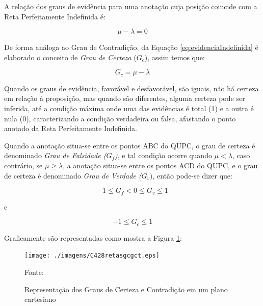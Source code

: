 A relação dos graus de evidência para uma anotação cuja posição coincide com a Reta Perfeitamente Indefinida é: 

\begin{center}
\begin{equation}
\mu - \lambda = 0
\label{eq:evidenciaIndefinida}
\end{equation}
\end{center}

De forma análoga ao Grau de Contradição, da Equação \ref{eq:evidenciaIndefinida} é elaborado o conceito de \emph{Grau de Certeza} ($G _c$), assim temos que: 

\begin{center}
\begin{equation}
G _{c} = \mu - \lambda
\label{eq:grauCerteza}
\end{equation}
\end{center}

Quando os graus de evidência, favorável e desfavorável, são iguais, não há certeza em relação à proposição, mas quando são diferentes, alguma certeza pode ser inferida, até a condição máxima onde uma das evidências é total (1) e a outra é nula (0), caracterizando a condição verdadeira ou falsa, afastando o ponto anotado da Reta Perfeitamente Indefinida. 

Quando a anotação situa-se entre os pontos ABC do QUPC, o grau de certeza é denominado \emph{Grau de Falsidade ($G _f$)}, e tal condição ocorre quando $\mu < \lambda $, caso contrário, se $\mu \ge \lambda $, a anotação situa-se entre os pontos ACD do QUPC, e o grau de certeza é denominado \emph{Grau de Verdade ($G _v)$}, então pode-se dizer que:
\begin{center}
\begin{equation}
-1 \le G _{f}  <  0 \le G _{v} \le 1
\label{eq:grauVerdadeFalsidade}
\end{equation}
\end{center}
e
\begin{center}
\begin{equation}
-1 \le G _{c} \le 1
\label{eq:grauCertezaIntervalo}
\end{equation}
\end{center}

Graficamente são representadas como mostra a Figura \ref{fig:retasgcgct}:

\begin{figure}[!htb]
\caption{Representação dos Graus de Certeza e Contradição em um plano cartesiano}
\center\texttt{[image: ./imagens/C428retasgcgct.eps]}
\label{fig:retasgcgct}

{\small Fonte: \cite{JoaoInacio}}
\end{figure}

